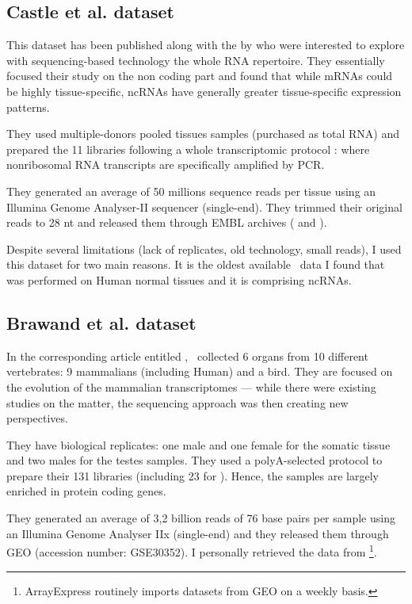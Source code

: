 \subsection{Castle et al. dataset}

This dataset has been published along with the 
by \citet{castleData} who were interested to explore
with sequencing-based technology the whole RNA repertoire. They essentially
focused their study on the non coding part and found that
while \glspl{mRNA} could be highly tissue-specific, \glspl{ncRNA} have generally
greater tissue-specific expression patterns.

They used multiple-donors pooled tissues samples (purchased as total \gls{RNA})
and prepared the 11 libraries following a whole transcriptomic protocol
\citep{Armour:2009}: where nonribosomal \gls{RNA} transcripts are
specifically amplified by \gls{PCR}.

They generated an average of 50 millions sequence reads per tissue
using an Illumina Genome Analyser-II sequencer (single-end).
They trimmed their original reads to 28 \gls{nt}
and released them through EMBL archives (
and ).

Despite several limitations (lack of replicates, old technology, small reads),
I used this dataset for two main reasons. It is the oldest available \Rnaseq\
data I found that was performed on Human normal tissues and it is comprising
\glspl{ncRNA}.

\subsection{Brawand et al. dataset}

In the corresponding article entitled ,
\citet{VTpaper}~collected 6 organs from 10 different vertebrates:
9 mammalians (including Human) and a bird. They are focused on the
evolution of the mammalian transcriptomes --- while there were existing studies
on the matter, the sequencing approach was then creating new perspectives.

They have biological replicates: one male
and one female for the somatic tissue and two males for the testes samples.
They used a polyA-selected protocol to prepare their 131 libraries (including 23
for \species{Homo sapiens}).
Hence, the samples are largely enriched in protein coding genes.

They generated an average of 3,2 billion reads of 76 base pairs per sample
using an Illumina Genome Analyser IIx (single-end) and they released them
through \gls{GEO} (accession number: GSE30352).
I personally retrieved the data from
\footnote{ArrayExpress routinely imports
datasets from \gls{GEO} on a weekly basis.}.

